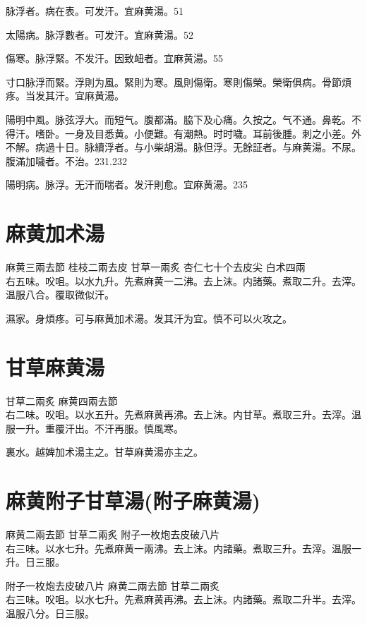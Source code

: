 脉浮者。病在表。可发汗。宜麻黄湯。51

{\khaai 太陽病。}脉浮數者。可发汗。宜麻黄湯。52

傷寒。脉浮緊。不发汗。因致衄者。宜麻黄湯。55

{\khaai 寸口}脉浮而緊。浮則为風。緊則为寒。風則傷衛。寒則傷榮。榮衛俱病。骨節煩疼。当发其汗。{\khaai 宜麻黄湯。}

陽明中風。脉弦浮大。而短气。腹都滿。脇下及心痛。久按之。气不通。鼻乾。不得汗。嗜卧。一身及目悉黄。小便難。有潮熱。时时噦。耳前後腫。刺之小差。外不解。病過十日。脉續浮者。与{\khaai 小}柴胡湯。脉但浮。无餘証者。与麻黄湯。不尿。腹滿加噦者。不治。231.232

陽明病。脉浮。无汗而喘者。发汗則愈。宜麻黄湯。235

\section{麻黄加术湯}

麻黄{\scriptsize 三兩去節} 桂枝{\scriptsize 二兩去皮} 甘草{\scriptsize 一兩炙} 杏仁{\scriptsize 七十个去皮尖} 白术{\scriptsize 四兩}\\
右五味。㕮咀。以水九升。先煮麻黄一二沸。去上沫。内諸藥。煮取二升。去滓。温服八合。覆取微似汗。

濕家。身煩疼。可与麻黄加术湯。发其汗为宜。慎不可以火攻之。

\section{甘草麻黄湯}

甘草{\scriptsize 二兩炙} 麻黄{\scriptsize 四兩去節}\\
右二味。㕮咀。以水五升。先煮麻黄{\khaai 再沸}。去上沫。内甘草。煮取三升。去滓。温服一升。重覆汗出。不汗再服。慎風寒。

裏水。越婢加术湯主之。甘草麻黄湯亦主之。

\section{麻黄附子甘草湯(附子麻黄湯)}

麻黄{\scriptsize 二兩去節} 甘草{\scriptsize 二兩炙} 附子{\scriptsize 一枚炮去皮破八片}\\
右三味。以水七升。先煮麻黄一兩沸。去上沫。内諸藥。煮取三升。去滓。温服一升。日三服。{\zhaoben}

附子{\scriptsize 一枚炮去皮破八片} 麻黄{\scriptsize 二兩去節} 甘草{\scriptsize 二兩炙}\\
右三味。㕮咀。以水七升。先煮麻黄再沸。去上沫。内諸藥。煮取二升半。去滓。温服八分。日三服。{\wuben}

